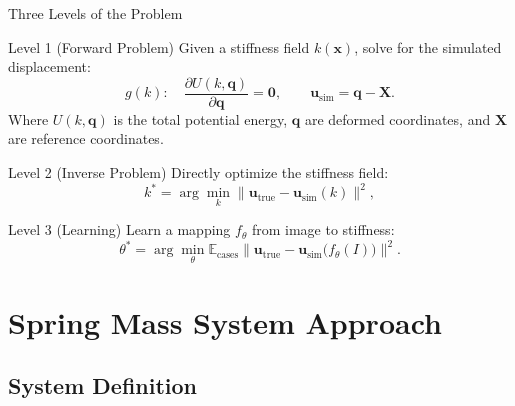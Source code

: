\documentclass{beamer}
\begin{document}
\begin{frame}[fragile]{Three Levels of the Problem}
\small
    \begin{block}{Level 1 (Forward Problem)}
    Given a stiffness field \(k(\mathbf{x})\), solve for the simulated displacement:
    \[
      g(k):\quad
      \frac{\partial U(k,\mathbf{q})}{\partial \mathbf{q}} = \mathbf{0},
      \qquad
      \mathbf{u}_{\mathrm{sim}} = \mathbf{q} - \mathbf{X}.
    \]
    Where $U(k,\mathbf{q})$ is the total potential energy, $\mathbf{q}$ are deformed coordinates, and $\mathbf{X}$ are reference coordinates.
    \end{block}
    
    \begin{block}{Level 2 (Inverse Problem)}
    Directly optimize the stiffness field:
    \[
      k^* = \arg\min_k
         \bigl\lVert \mathbf{u}_{\mathrm{true}}
         - \mathbf{u}_{\mathrm{sim}}(k)\bigr\rVert^2
    ,
    \]
    \end{block}
    \begin{block}{Level 3 (Learning)}
    Learn a mapping $f_\theta$ from image to stiffness:
    \[
      \theta^* = \arg\min_\theta
         \mathbb{E}_{\mathrm{cases}}
         \bigl\lVert \mathbf{u}_{\mathrm{true}}
         - \mathbf{u}_{\mathrm{sim}}\bigl(f_\theta(I)\bigr)\bigr\rVert^2.
    \]
    \end{block}
\end{frame}



\section{Spring Mass System Approach}
\subsection{System Definition}
\end{document}
